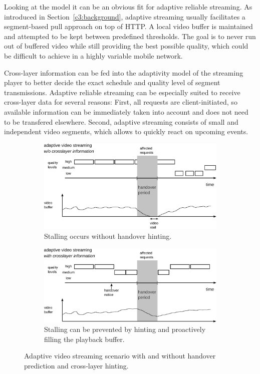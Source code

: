 Looking at the model it can be an obvious fit for adaptive reliable streaming. As introduced in Section~\ref{c3:background}, adaptive streaming usually facilitates a segment-based pull approach on top of \gls{HTTP}. A local video buffer is maintained and attempted to be kept between predefined thresholds. The goal is to never run out of buffered video while still providing the best possible quality, which could be difficult to achieve in a highly variable mobile network.

Cross-layer information can be fed into the adaptivity model of the streaming player to better decide the exact schedule and quality level of segment transmissions. Adaptive reliable streaming can be  especially suited to receive cross-layer data for several reasons: First, all requests are client-initiated, so available information can be immediately taken into account and does not need to be transfered elsewhere. Second, adaptive streaming consists of small and independent video segments, which allows to quickly react on upcoming events.

\begin{figure}[htb]
        \centering
        \begin{subfigure}[b]{0.80\textwidth}
            \centering
			\includegraphics[width=\textwidth]{images/adaptive-streaming-no-cl.pdf}
			\caption{Stalling occurs without handover hinting.}
			\label{c5:fig:streaming-hinting-no-cl}
        \end{subfigure}%

        \begin{subfigure}[b]{0.80\textwidth}
			\centering
			\includegraphics[width=\textwidth]{images/adaptive-streaming-cl.pdf}
			\caption{Stalling can be prevented by hinting and proactively filling the playback buffer.}
			\label{c5:fig:streaming-hinting-cl}
		   \end{subfigure}%
	\caption{Adaptive video streaming scenario with and without handover prediction and cross-layer hinting.}
\label{c5:fig:streaming-hinting}
\end{figure}

